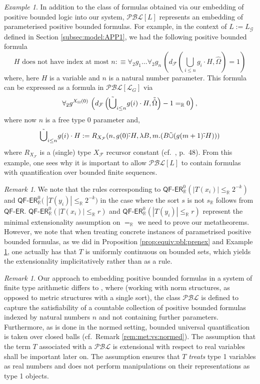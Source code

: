\documentclass[11pt]{amsart}
\theoremstyle{definition}
\theoremstyle{remark}
\newtheorem{remark}[theorem]{Remark}
\newtheorem{example}[theorem]{Example}
\def\RR{\mathbb{R}}
\newcommand{\QFER}{\textsf{QF}\mbox{-}\textsf{ER}}
\begin{document}
\begin{example}
\label{ex:pbl}
In addition to the class of formulas obtained via our embedding of positive bounded logic into our system, $\mathcal{PBL}[L]$ represents an embedding of parameterised positive bounded formulas. For example, in the context of $L:= L_{\mathcal{G}}$ defined  in Section \ref{subsec:model:APP1}, we had the following positive bounded formula
\[
\mbox{$H$ does not have index at most $n$}:\equiv \forall_2 g_1\ldots\forall_2 g_n\,\left( d_{\mathcal{F}}\left(\bigcup_{i\le n}g_i\cdot H, \hat{\Omega}\right)=1  \right)
\]
where, here $H$ is a variable and $n$ is a natural number parameter. This formula can be expressed as a formula in $\mathcal{PBL}[\mathcal{L}_{G}]$ via
\[
\forall_{2} g^{X_{\Omega}(0)}\,\left( d_{\mathcal{F}}\left(\Tilde{\bigcup}_{i\le n}g(i)\cdot H, \Tilde{\hat{\Omega}}\right)-1=_\RR 0 \right),
\]
where now $n$ is a free type 0 parameter and, 
\[
\Tilde{\bigcup}_{i\le n}g(i)\cdot H:=R_{X_\mathcal{F}}(n,g(0)\tilde{\cdot} H,\lambda B,m.(B\tilde{\cup} (g(m+1)\tilde{\cdot} H)))
\]
where $R_{X_\mathcal{F}}$ is a (single) type $X_\mathcal{F}$ recursor constant (cf.\ \cite{Kohlenbach2008}, p.\ 48). From this example, one sees why it is important to allow $\mathcal{PBL}[L]$ to contain formulas with quantification over bounded finite sequences.
\end{example}
\begin{remark}
    We note that the rules corresponding to $\QFER^0_\RR(|T(x_i)| \le_\RR 2^{-k})$ and $\QFER^0_\RR($ $|T(y_i)|\le_\RR2^{-k})$ in the case where the sort $s$ is not $s_\RR$ follows from $\QFER$. $\QFER^0_\RR(|T(x_i)| \le_\RR r)$ and $\QFER^0_\RR(|T(y_i)|\le_\RR r)$ represent the minimal extensionality assumption on $=_\RR$ we need to prove our metatheorems. However, we note that when treating concrete instances of parametrised positive bounded formulas, as we did in Proposition \ref{prop:equiv:pbl:prenex} and Example \ref{ex:pbl}, one actually has that $T$ is uniformly continuous on bounded sets, which yields the extensionality implicitatively rather than as a rule.
\end{remark}

\begin{remark}
\label{rem:PBL:diff}
Our approach to embedding positive bounded formulas in a system of finite type arithmetic differs to \cite{GuK2016}, where (working with norm structures, as opposed to metric structures with a single sort), the class $\mathcal{PBL}$ is defined to capture the satisfiability of a countable collection of positive bounded formulas indexed by natural numbers $n$ and not containing further parameters. Furthermore, as \cite{GuK2016} is done in the normed setting, bounded universal quantification is taken over closed balls (cf.\ Remark \ref{rem:met:vs:normed}). The assumption that the term $T$ associated with a $\mathcal{PBL}$ is extensional with respect to real variables shall be important later on. The assumption ensures that $T$ \emph{treats} type 1 variables as real numbers and does not perform manipulations on their representations as type 1 objects.

\end{remark}
\end{document}

